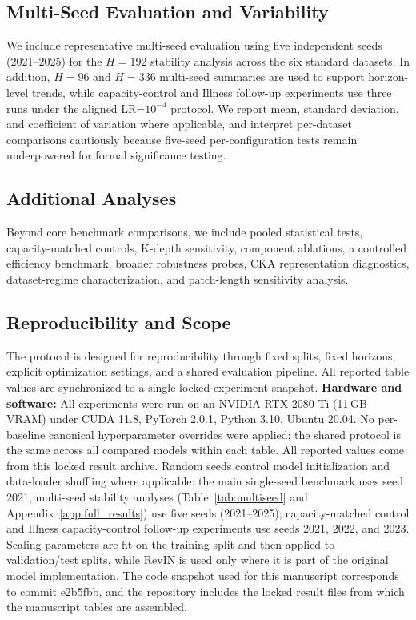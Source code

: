 \documentclass{ieeeaccess}
\begin{document}
\subsection{Multi-Seed Evaluation and Variability}
We include representative multi-seed evaluation using five independent seeds
(2021--2025) for the $H=192$ stability analysis across the six standard datasets.
In addition, $H=96$ and $H=336$ multi-seed summaries are used to support
horizon-level trends, while capacity-control and Illness follow-up experiments use
three runs under the aligned LR=$10^{-4}$ protocol. We report mean, standard
deviation, and coefficient of variation where applicable, and interpret
per-dataset comparisons cautiously because five-seed per-configuration tests remain
underpowered for formal significance testing.

\subsection{Additional Analyses}
Beyond core benchmark comparisons, we include pooled statistical tests,
capacity-matched controls, K-depth sensitivity, component ablations, a controlled
efficiency benchmark, broader robustness probes, CKA representation diagnostics,
dataset-regime characterization, and patch-length sensitivity analysis.

\subsection{Reproducibility and Scope}
The protocol is designed for reproducibility through fixed splits, fixed horizons,
explicit optimization settings, and a shared evaluation pipeline. All reported table
values are synchronized to a single locked experiment snapshot.
\textbf{Hardware and software:} All experiments were run on an NVIDIA RTX 2080 Ti
(11\,GB VRAM) under CUDA 11.8, PyTorch 2.0.1, Python 3.10, Ubuntu 20.04.
No per-baseline canonical hyperparameter overrides were applied; the shared
protocol is the same across all compared models within each table.
All reported values come from this locked result archive. Random seeds control model
initialization and data-loader shuffling where applicable: the main single-seed
benchmark uses seed 2021; multi-seed stability analyses (Table~\ref{tab:multiseed}
and Appendix~\ref{app:full_results}) use five seeds (2021--2025); capacity-matched
control and Illness capacity-control follow-up experiments use seeds 2021, 2022,
and 2023. Scaling parameters are fit on the training split and then applied to
validation/test splits, while RevIN is used only where it is part of the original
model implementation. The code snapshot used for this manuscript corresponds to
commit e2b5fbb, and the repository includes the locked result files from which the
manuscript tables are assembled.
\end{document}
